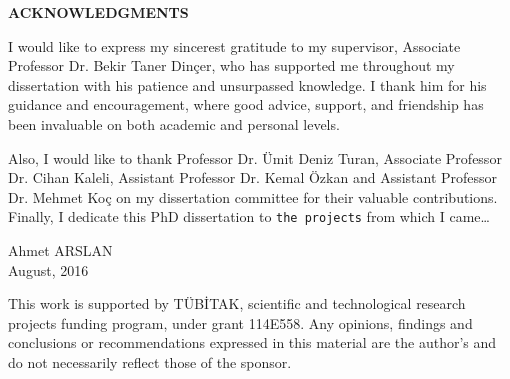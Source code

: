 %
%
%

\newpage
\doublespacing

\begin{center}{\textbf{ACKNOWLEDGMENTS}}\end{center}

I would like to express my sincerest gratitude to my supervisor, Associate Professor Dr. Bekir Taner Din\c{c}er, who has supported me throughout my dissertation with his patience and unsurpassed knowledge. I thank him for his guidance and encouragement, where good advice, support, and friendship has been invaluable on both academic and personal levels.

Also, I would like to thank Professor Dr. \"{U}mit Deniz Turan, Associate Professor Dr. Cihan Kaleli, Assistant Professor Dr. Kemal \"{O}zkan and Assistant Professor Dr. Mehmet Ko\c{c} on my dissertation committee for their valuable contributions. \\

\noindent
Finally, I dedicate this PhD dissertation to \texttt{the projects} from which I came\ldots  \\

\begin{flushright}
Ahmet ARSLAN \\  August, 2016
\end{flushright}

\vspace{7.2cm} 

\noindent
{\small This work is supported by T\"{U}B\.{I}TAK, scientific and technological research projects funding program, under grant 114E558. Any opinions, findings and conclusions or recommendations expressed in this material are the author's and do not necessarily reflect those of the sponsor.}